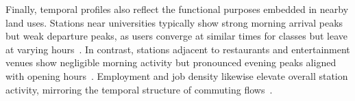 
    Finally, temporal profiles also reflect the functional purposes embedded in nearby land uses. Stations near universities typically show strong morning arrival peaks but weak departure peaks, as users converge at similar times for classes but leave at varying hours~\cite{FaghihImani2014}. In contrast, stations adjacent to restaurants and entertainment venues show negligible morning activity but pronounced evening peaks aligned with opening hours~\cite{FaghihImani2016}. Employment and job density likewise elevate overall station activity, mirroring the temporal structure of commuting flows~\cite{Tran2015, Chen2021_Identifying}.
